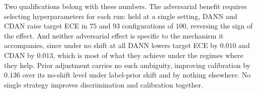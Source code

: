 Two qualifications belong with these numbers. The adversarial benefit requires
selecting hyperparameters for each run: held at a single setting, DANN and CDAN
raise target ECE in $75$ and $93$ configurations of $100$, reversing the sign of
the effect. And neither adversarial effect is specific to the mechanism it
accompanies, since under no shift at all DANN lowers target ECE by $0.010$ and
CDAN by $0.013$, which is most of what they achieve under the regimes where they
help. Prior adjustment carries no such ambiguity, improving calibration by
$0.136$ over its no-shift level under label-prior shift and by nothing
elsewhere. No single strategy improves discrimination and calibration together.
